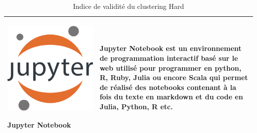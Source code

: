 \begin{table}[H]
\begin{tabular}{|m{5cm}|m{12cm}|}
  \begin{center}
    \begin{minipage}{.3\textwidth}
    \includegraphics[width=\textwidth]{images/chapitre7/jupyter.png}
  \end{minipage}
  \end{center}
  \centering \textbf{Jupyter Notebook} \cite{Kluyver2016jupyter} & Jupyter Notebook est un environnement de programmation interactif basé sur le web utilisé pour programmer en python, R, Ruby, Julia ou encore Scala qui permet de réalisé des notebooks contenant à la fois du texte en markdown et du code en Julia, Python, R etc.  \\ \hline

  \end{tabular}
	\caption{Indice de validité du clustering Hard}
	\label{tools}
\end{table}

\newpage

